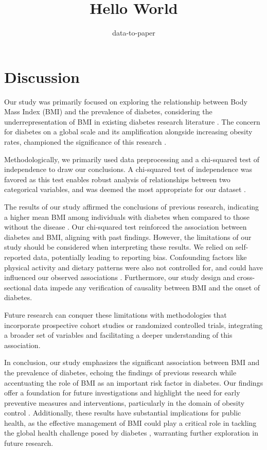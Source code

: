 \documentclass[12pt]{article}
\title{Hello World}
\author{data-to-paper}
\begin{document}
\maketitle

\section{Discussion}

Our study was primarily focused on exploring the relationship between Body Mass Index (BMI) and the prevalence of diabetes, considering the underrepresentation of BMI in existing diabetes research literature \cite{Uloko2018PrevalenceAR}. The concern for diabetes on a global scale and its amplification alongside increasing obesity rates, championed the significance of this research \cite{Mokdad2001TheCE}. 

Methodologically, we primarily used data preprocessing and a chi-squared test of independence to draw our conclusions. A chi-squared test of independence was favored as this test enables robust analysis of relationships between two categorical variables, and was deemed the most appropriate for our dataset \cite{Mongraw-Chaffin2015TheSA}. 

The results of our study affirmed the conclusions of previous research, indicating a higher mean BMI among individuals with diabetes when compared to those without the disease \cite{rnlv2010ImpactOB, Rho2014IndependentIO, Read2021BMIAR}. Our chi-squared test reinforced the association between diabetes and BMI, aligning with past findings. However, the limitations of our study should be considered when interpreting these results. We relied on self-reported data, potentially leading to reporting bias. Confounding factors like physical activity and dietary patterns were also not controlled for, and could have influenced our observed associations \cite{Uloko2018PrevalenceAR}. Furthermore, our study design and cross-sectional data impede any verification of causality between BMI and the onset of diabetes.

Future research can conquer these limitations with methodologies that incorporate prospective cohort studies or randomized controlled trials, integrating a broader set of variables and facilitating a deeper understanding of this association. 

In conclusion, our study emphasizes the significant association between BMI and the prevalence of diabetes, echoing the findings of previous research while accentuating the role of BMI as an important risk factor in diabetes. Our findings offer a foundation for future investigations and highlight the need for early preventive measures and interventions, particularly in the domain of obesity control \cite{Zhu2019RacialEthnicDI}. Additionally, these results have substantial implications for public health, as the effective management of BMI could play a critical role in tackling the global health challenge posed by diabetes \cite{Uloko2018PrevalenceAR}, warranting further exploration in future research.
\end{document}

